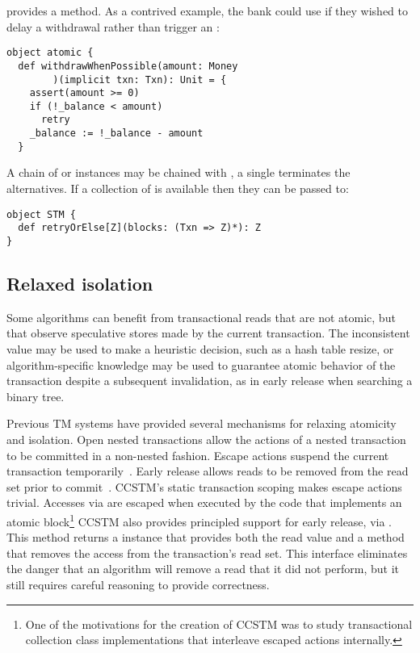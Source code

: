  provides a  method.  As a contrived example,
the bank could use  if they wished to delay a withdrawal
rather than trigger an :
\lstset{numbers=none}
\begin{lstlisting}
object atomic {
  def withdrawWhenPossible(amount: Money
        )(implicit txn: Txn): Unit = {
    assert(amount >= 0)
    if (!_balance < amount)
      retry
    _balance := !_balance - amount
  }
\end{lstlisting}
\lstset{numbers=left}

A chain of  or  instances may be chained
with , a single  terminates the alternatives.
If a collection of \code{~=>~} is available then
they can be passed to:
\lstset{numbers=none}
\begin{lstlisting}
object STM {
  def retryOrElse[Z](blocks: (Txn => Z)*): Z
}
\end{lstlisting}
\lstset{numbers=left}


\subsection{Relaxed isolation}
\label{sec:unrecordedread}

Some algorithms can benefit from transactional reads that are not
atomic, but that observe speculative stores made by the current
transaction.  The inconsistent value may be used to make a heuristic decision,
such as a hash table resize, or algorithm-specific knowledge
may be used to guarantee atomic behavior of the transaction despite
a subsequent invalidation, as in early release when searching a binary tree.

Previous TM systems have provided several mechanisms for relaxing atomicity and
isolation.
Open nested transactions allow the actions of a
nested transaction to be committed in a non-nested fashion.  Escape actions
suspend the current transaction temporarily~\cite{harris04exceptions}.  Early
release
allows reads to be removed from the read set prior to
commit~\cite{HerlihyLMS03}.  CCSTM's static transaction scoping makes escape
actions trivial.  Accesses via  are escaped when executed by the
code that implements an atomic block\footnote{One of the motivations for the
creation of CCSTM was to study transactional collection class implementations
that interleave escaped actions internally.}
CCSTM also provides principled support for
early release, via .  This method returns
a  instance that provides both the read value
and a method that removes the access from the transaction's read set.
This interface eliminates the danger that an algorithm will remove a
read that it did not perform, but it still requires careful reasoning to
provide correctness.

